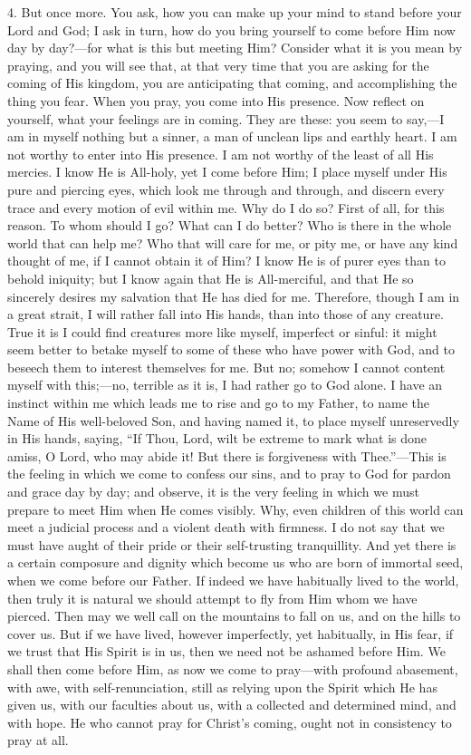4. But once more. You ask, how you can make up your mind to stand
before your Lord and God; I ask in turn, how do you bring yourself to
come before Him now day by day?—for what is this but meeting Him?
Consider what it is you mean by praying, and you will see that, at
that very time that you are asking for the coming of His kingdom, you
are anticipating that coming, and accomplishing the thing you fear.
When you pray, you come into His presence. Now reflect on yourself,
what your feelings are in coming. They are these: you seem to say,—I
am in myself nothing but a sinner, a man of unclean lips and earthly
heart. I am not worthy to enter into His presence. I am not worthy of
the least of all His mercies. I know He is All-holy, yet I come before
Him; I place myself under His pure and piercing eyes, which look me
through and through, and discern every trace and every motion of evil
within me. Why do I do so? First of all, for this reason. To whom
should I go? What can I do better? Who is there in the whole world
that can help me? Who that will care for me, or pity me, or have any
kind thought of me, if I cannot obtain it of Him? I know He is of
purer eyes than to behold iniquity; but I know again that He is
All-merciful, and that He so sincerely desires my salvation that He
has died for me. Therefore, though I am in a great strait, I will
rather fall into His hands, than into those of any creature. True it
is I could find creatures more like myself, imperfect or sinful: it
might seem better to betake myself to some of these who have power
with God, and to beseech them to interest themselves for me. But no;
somehow I cannot content myself with this;—no, terrible as it is, I
had rather go to God alone. I have an instinct within me which leads
me to rise and go to my Father, to name the Name of His well-beloved
Son, and having named it, to place myself unreservedly in His hands,
saying, ``If Thou, Lord, wilt be extreme to mark what is done amiss, O
Lord, who may abide it! But there is forgiveness with Thee.''—This
is the feeling in which we come to confess our sins, and to pray to
God for pardon and grace day by day; and observe, it is the very
feeling in which we must prepare to meet Him when He comes visibly.
Why, even children of this world can meet a judicial process and a
violent death with firmness. I do not say that we must have aught of
their pride or their self-trusting tranquillity. And yet there is a
certain composure and dignity which become us who are born of immortal
seed, when we come before our Father. If indeed we have habitually
lived to the world, then truly it is natural we should attempt to fly
from Him whom we have pierced. Then may we well call on the mountains
to fall on us, and on the hills to cover us. But if we have lived,
however imperfectly, yet habitually, in His fear, if we trust that His
Spirit is in us, then we need not be ashamed before Him. We shall then
come before Him, as now we come to pray—with profound abasement, with
awe, with self-renunciation, still as relying upon the Spirit which He
has given us, with our faculties about us, with a collected and
determined mind, and with hope. He who cannot pray for Christ's
coming, ought not in consistency to pray at all.

